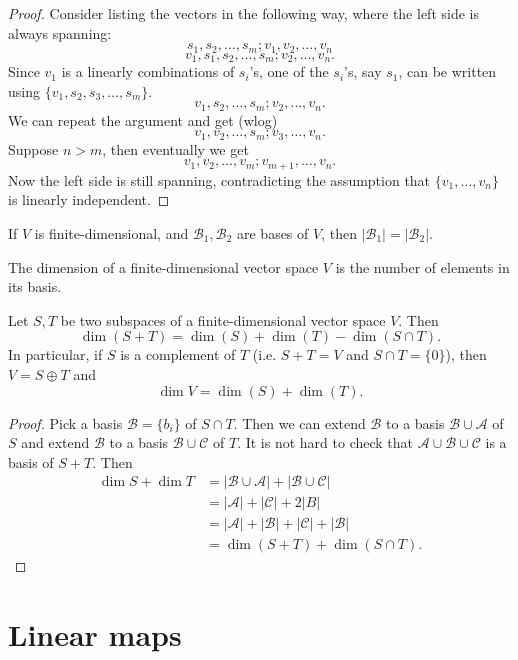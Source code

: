 \documentclass{scrartcl}
\def\B{\mathcal{B}}
\begin{document}
\begin{proof}
	Consider listing the vectors in the following way, where the left side is always spanning:
	\[s_1, s_2, \dots, s_m; v_1, v_2, \dots, v_n\]
	\[v_1, s_1, s_2, \dots, s_m; v_2, \dots, v_n.\]
	Since $v_1$ is a linearly combinations of $s_i$'s, one of the $s_i$'s, say $s_1$, can be written using $\{v_1, s_2, s_3, \dots, s_m\}$. 
	\[v_1, s_2, \dots, s_m; v_2, \dots, v_n.\]
	We can repeat the argument and get (wlog)
	\[v_1, v_2, \dots, s_m; v_3, \dots, v_n.\]
	Suppose $n>m$, then eventually we get
	\[v_1, v_2, \dots, v_m; v_{m+1}, \dots, v_n.\]
	Now the left side is still spanning, contradicting the assumption that $\{v_1, \dots, v_n\}$ is linearly independent. 
\end{proof}
\begin{corollary}
	If $V$ is finite-dimensional, and $\B_1, \B_2$ are bases of $V$, then $|\B_1| = |\B_2|$. 
\end{corollary}
\begin{definition}
	The dimension of a finite-dimensional vector space $V$ is the number of elements in its basis.
\end{definition}
\begin{proposition}
	Let $S, T$ be two subspaces of a finite-dimensional vector space $V$. Then 
	\[\dim(S+T) = \dim(S)+\dim(T)-\dim(S \cap T).\]
	In particular, if $S$ is a complement of $T$ (i.e. $S + T = V$ and $S \cap T = \{0\}$), then $V = S \oplus T$ and 
	\[\dim V = \dim(S)+\dim(T).\]
\end{proposition}
\begin{proof}
	Pick a basis $\B = \{b_i\}$ of $S \cap T$. Then we can extend $\B$ to a basis $\B \cup \mathcal{A}$ of $S$ and extend $\B$ to a basis $\B \cup \mathcal{C}$ of $T$. It is not hard to check that $\mathcal{A} \cup \B \cup \mathcal{C}$ is a basis of $S+T$. Then 
	\begin{align*}
		\dim{S}+\dim{T} &= |\B \cup \mathcal{A}| + |\B \cup \mathcal{C}| \\
		&= |\mathcal{A}|+|\mathcal{C}|+2|B| \\
		&= |\mathcal{A}|+|\mathcal{B}|+|\mathcal{C}|+|\B| \\
		&= \dim(S+T)+\dim(S \cap T).
	\end{align*}
\end{proof}
\section{Linear maps}
\end{document}
